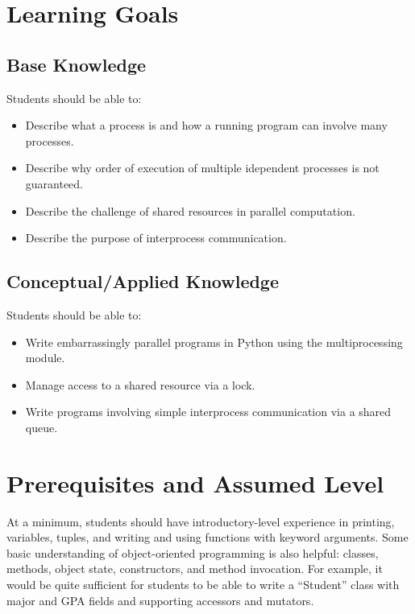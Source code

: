 \documentclass[letterpaper,10pt,openany,oneside]{sphinxmanual}
\begin{document}
\chapter{Learning Goals}
\label{index:learning-goals}

\section{Base Knowledge}
\label{index:base-knowledge}
Students should be able to:
\begin{itemize}
\item {} 
Describe what a process is and how a running program can involve many
processes.

\item {} 
Describe why order of execution of multiple idependent processes is not guaranteed.

\item {} 
Describe the challenge of shared resources in parallel computation.

\item {} 
Describe the purpose of interprocess communication.

\end{itemize}


\section{Conceptual/Applied Knowledge}
\label{index:conceptual-applied-knowledge}
Students should be able to:
\begin{itemize}
\item {} 
Write embarrassingly parallel programs in Python using the
multiprocessing module.

\item {} 
Manage access to a shared resource via a lock.

\item {} 
Write programs involving simple interprocess communication via a
shared queue.

\end{itemize}


\chapter{Prerequisites and Assumed Level}
\label{index:prerequisites-and-assumed-level}
At a minimum, students should have introductory-level experience in
printing, variables, tuples, and writing and using functions with
keyword arguments. Some basic understanding of object-oriented
programming is also helpful: classes, methods, object state,
constructors, and method invocation. For example, it would be quite
sufficient for students to be able to write a “Student” class with major
and GPA fields and supporting accessors and mutators.
\end{document}
